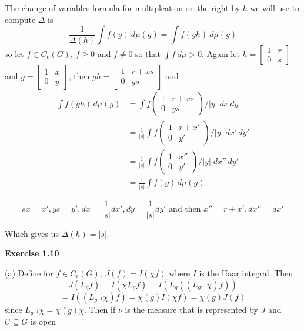 \documentclass{article}
\begin{document}
The change of variables formula for multiplcation on the right by $h$ we will use to compute $\Delta$ is 
$$\frac{1}{\Delta(h)} \int f(g) \ d \mu(g)  = \int f(gh) \ d \mu(g)$$
so let $f \in C_c(G)$, $f \geq 0$ and $f\neq 0$ so that $\int f \ d\mu > 0$. Again let $h = \begin{bmatrix} 1 & r \\ 0 & s \end{bmatrix}$ and $g = \begin{bmatrix} 1 & x \\ 0 & y \end{bmatrix}$, then $gh = \begin{bmatrix} 1 & r + xs \\ 0 & ys \end{bmatrix}$ and 
\begin{align*}
\int f(gh)\,d\mu(g)
&= \int f\!\begin{pmatrix} 1 & r + xs \\ 0 & ys \end{pmatrix}\!/|y| \; dx\,dy \\[0.3em]
&= \frac{1}{|s|}\int f\!\begin{pmatrix} 1 & r + x' \\ 0 & y' \end{pmatrix}/|y|\; dx'\,dy' \\[0.3em]
&= \frac{1}{|s|}\int f\!\begin{pmatrix} 1 & x'' \\ 0 & y' \end{pmatrix}/|y|\; dx''\,dy' \\[0.3em]
&= \frac{1}{|s|}\int f(g)\,d\mu(g).
\end{align*}


$$sx = x', ys = y', dx = \frac{1}{|s|} dx', dy = \frac{1}{|s|} dy' \text{ and then } x'' = r+x', dx'' = dx'$$ 

Which gives us $\Delta(h) = |s|$.

\vspace{0.5cm}

\textbf{Exercise 1.10}

\vspace{0.5cm}

(a) Define for $f \in C_c(G)$, $J(f) = I(\chi f)$ where $I$ is the Haar integral. Then 
$$J(L_gf) = I(\chi L_g f) = I(L_g((L_{g^{-1}}\chi) f)) $$
$$= I((L_{g^{-1}}\chi) f) = \chi(g) I(\chi f) = \chi(g) J(f)$$
since $L_{g^{-1}}\chi = \chi(g)\chi$. Then if $\nu$ is the measure that is represented by $J$ and $U \subseteq G$ is open
\end{document}

